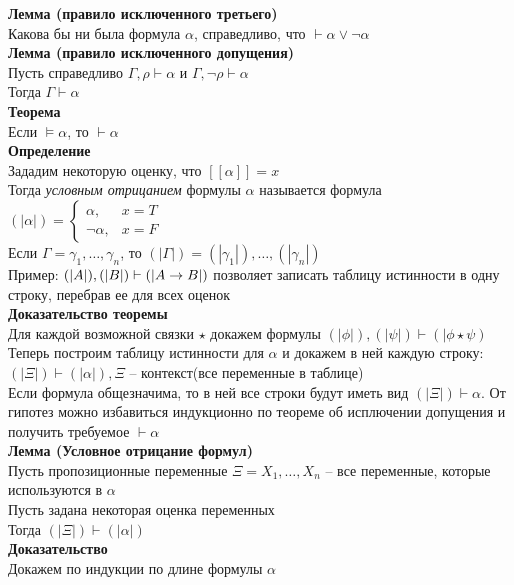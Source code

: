 \documentclass[12pt]{article}
\begin{document}
\textbf{Лемма (правило исключенного третьего)}\\
Какова бы ни была формула $\alpha$, справедливо, что $\vdash \alpha \lor \lnot \alpha$\\
\textbf{Лемма (правило исключенного допущения)}\\
Пусть справедливо $\Gamma, \rho \vdash \alpha$ и $\Gamma, \lnot \rho \vdash \alpha$\\
Тогда $\Gamma \vdash \alpha$\\
\textbf{Теорема}\\
Если $\models \alpha$, то $\vdash \alpha$\\
\textbf{Определение}\\
Зададим некоторую оценку, что $[[\alpha]] = x$\\
Тогда \textit{условным отрицанием} формулы $\alpha$ называется формула $(|\alpha|) = \left\{\begin{array}{cc}
    \alpha, & x = T\\
    \lnot \alpha, & x = F
\end{array}\right.$\\
Если $\Gamma=\gamma_1, \ldots, \gamma_n$, то $(|\Gamma|) = (|\gamma_1|),\ldots, (|\gamma_n|)$\\
Пример: $(|A|), (|B|) \vdash (|A\rightarrow B|)$ позволяет записать таблицу истинности в одну строку, перебрав ее для всех оценок\\
\textbf{Доказательство теоремы}\\
Для каждой возможной связки $\star$ докажем формулы $(|\phi|), (|\psi|) \vdash (|\phi \star \psi)$\\
Теперь построим таблицу истинности для $\alpha$ и докажем в ней каждую строку:\\
$(|\Xi|) \vdash (|\alpha|), \Xi$ -- контекст(все переменные в таблице)\\
Если формула общезначима, то в ней все строки будут иметь вид $(|\Xi|) \vdash \alpha$. От гипотез можно избавиться индукционно по теореме об исплючении допущения и получить требуемое $\vdash \alpha$\\
\textbf{Лемма (Условное отрицание формул)}\\
Пусть пропозиционные переменные $\Xi = X_1, \ldots, X_n$ -- все переменные, которые используются в $\alpha$\\
Пусть задана некоторая оценка переменных\\
Тогда $(|\Xi|) \vdash (|\alpha|)$\\
\textbf{Доказательство}\\
Докажем по индукции по длине формулы $\alpha$
\end{document}
